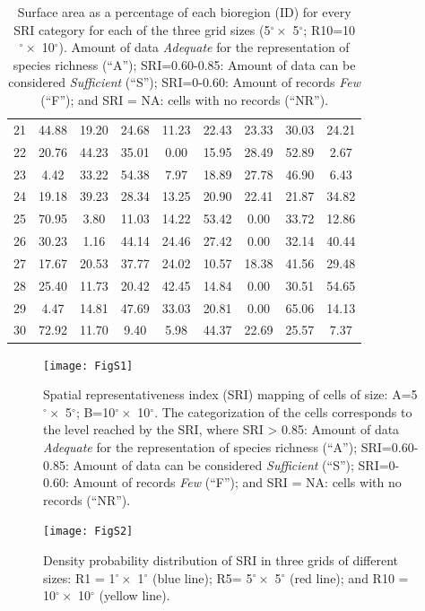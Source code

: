 \documentclass[12pt,authoryear]{elsarticle}
\begin{document}
\begin{table}[h]
\begin{tabular}{| c |c | c  | c | c | c | c | c | c|}
  21 & 44.88 & 19.20 & 24.68 & 11.23 & 22.43 & 23.33 & 30.03 & 24.21 \\ 
  22 & 20.76 & 44.23 & 35.01 &  0.00 & 15.95 & 28.49 & 52.89 &  2.67 \\ 
  23 &  4.42 & 33.22 & 54.38 &  7.97 & 18.89 & 27.78 & 46.90 &  6.43 \\ 
  24 & 19.18 & 39.23 & 28.34 & 13.25 & 20.90 & 22.41 & 21.87 & 34.82 \\ 
  25 & 70.95 &  3.80 & 11.03 & 14.22 & 53.42 &  0.00 & 33.72 & 12.86 \\ 
  26 & 30.23 &  1.16 & 44.14 & 24.46 & 27.42 &  0.00 & 32.14 & 40.44 \\ 
  27 & 17.67 & 20.53 & 37.77 & 24.02 & 10.57 & 18.38 & 41.56 & 29.48 \\ 
  28 & 25.40 & 11.73 & 20.42 & 42.45 & 14.84 &  0.00 & 30.51 & 54.65 \\ 
  29 & 4.47 & 14.81 & 47.69 & 33.03 & 20.81 &  0.00 & 65.06 & 14.13 \\ 
  30 & 72.92 & 11.70 &  9.40 &  5.98 & 44.37 & 22.69 & 25.57 & 7.37 \\ 
   \hline
\end{tabular}
\caption{Surface area as a percentage of each bioregion (ID) for every SRI category for each of the three grid sizes (5$^\circ \times$ 5$^\circ$; R10=10$^\circ \times$ 10$^\circ$). Amount of data \textit{Adequate} for the representation of species richness (``A''); SRI=0.60-0.85: Amount of data can be considered \textit{Sufficient} (``S''); SRI=0-0.60: Amount of records \textit{Few} (``F''); and SRI = NA: cells with no records (``NR'').
\label{tab: 3grids}}
\end{table}

\begin{figure}[h]
\centering
\texttt{[image: FigS1]}
\caption[]{Spatial representativeness index (SRI) mapping of cells of size: A=5$^\circ \times$ 5$^\circ$; B=10$^\circ \times$ 10$^\circ$. The categorization of the cells corresponds to the level reached by the SRI, where SRI > 0.85: Amount of data \textit{Adequate} for the representation of species richness (``A''); SRI=0.60-0.85: Amount of data can be considered \textit{Sufficient} (``S''); SRI=0-0.60: Amount of records \textit{Few} (``F''); and SRI = NA: cells with no records (``NR'').
\label{fig:FigS1}}
\end{figure}

\begin{figure}[h]
  \centering
  \texttt{[image: FigS2]}
    \caption{Density probability distribution of SRI in three grids of different sizes: R1 = 1$^\circ \times$ 1$^\circ$ (blue line); R5= 5$^\circ \times$ 5$^\circ$ (red line); and R10 = 10$^\circ \times$ 10$^\circ$ (yellow line).
    \label{fig:FigS2}
  }
\end{figure}
\end{document}
